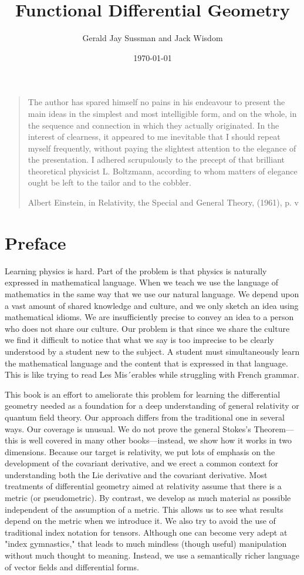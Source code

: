 \documentclass[11pt]{article}
\author{Gerald Jay Sussman and Jack Wisdom}
\date{\today}
\title{Functional Differential Geometry}
\begin{document}
\maketitle
\tableofcontents

\begin{quote}
The author has spared himself no pains in his endeavour to present the main
ideas in the simplest and most intelligible form, and on the whole, in the
sequence and connection in which they actually originated. In the interest of
clearness, it appeared to me inevitable that I should repeat myself frequently,
without paying the slightest attention to the elegance of the presentation. I
adhered scrupulously to the precept of that brilliant theoretical physicist L.
Boltzmann, according to whom matters of elegance ought be left to the tailor and
to the cobbler.

Albert Einstein, in Relativity, the Special and General Theory, (1961), p. v
\end{quote}

\section{Preface}
\label{sec:org7280fff}

Learning physics is hard. Part of the problem is that physics is naturally
expressed in mathematical language. When we teach we use the language of
mathematics in the same way that we use our natural language. We depend upon a
vast amount of shared knowledge and culture, and we only sketch an idea using
mathematical idioms. We are insufficiently precise to convey an idea to a person
who does not share our culture. Our problem is that since we share the culture
we find it difficult to notice that what we say is too imprecise to be clearly
understood by a student new to the subject. A student must simultaneously learn
the mathematical language and the content that is expressed in that language.
This is like trying to read Les Mis´erables while struggling with French
grammar.

This book is an effort to ameliorate this problem for learning the differential
geometry needed as a foundation for a deep understanding of general relativity
or quantum field theory. Our approach differs from the traditional one in
several ways. Our coverage is unusual. We do not prove the general Stokes's
Theorem— this is well covered in many other books—instead, we show how it works
in two dimensions. Because our target is relativity, we put lots of emphasis on
the development of the covariant derivative, and we erect a common context for
understanding both the Lie derivative and the covariant derivative. Most
treatments of differential geometry aimed at relativity assume that there is a
metric (or pseudometric). By contrast, we develop as much material as possible
independent of the assumption of a metric. This allows us to see what results
depend on the metric when we introduce it. We also try to avoid the use of
traditional index notation for tensors. Although one can become very adept at
"index gymnastics," that leads to much mindless (though useful) manipulation
without much thought to meaning. Instead, we use a semantically richer language
of vector fields and differential forms.
\end{document}

